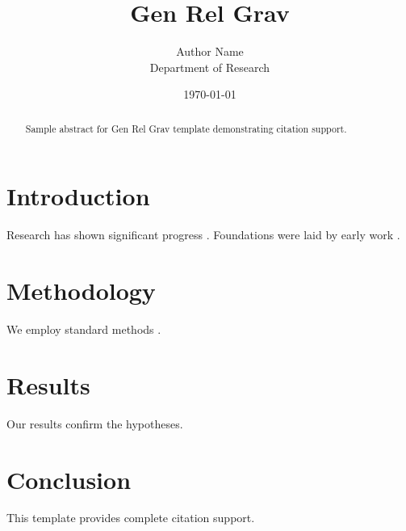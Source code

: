 \documentclass{llncs}
\title{Gen Rel Grav}
\author{Author Name \\ \small Department of Research}
\date{\today}
\begin{document}
\maketitle

\begin{abstract}
Sample abstract for Gen Rel Grav template demonstrating citation support.
\end{abstract}

\section{Introduction}
Research has shown significant progress \citep{einstein1905}. Foundations were laid by early work \citep{turing1950}.

\section{Methodology}
We employ standard methods \citep{knuth1984}.

\section{Results}
Our results confirm the hypotheses.

\section{Conclusion}
This template provides complete citation support.



\end{document}
